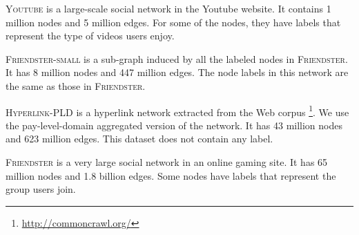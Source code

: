 \documentclass[sigconf]{acmart}
\newcommand{\dataset}[1]{\textsc{#1}\xspace}
\begin{document}
\begin{itemize}[leftmargin=10pt]
    \begin{item}
        \dataset{Youtube} \cite{mislove2007measurement} is a large-scale social network in the Youtube website. It contains 1 million nodes and 5 million edges. For some of the nodes, they have labels that represent the type of videos users enjoy.
    \end{item}
    \begin{item}
        \dataset{Friendster-small} \cite{yang2015defining} is a sub-graph induced by all the labeled nodes in \dataset{Friendster}. It has 8 million nodes and 447 million edges. The node labels in this network are the same as those in \dataset{Friendster}.
    \end{item}
    \begin{item}
        \dataset{Hyperlink-PLD} \cite{meusel2015graph} is a hyperlink network extracted from the Web corpus \footnote{\url{http://commoncrawl.org/}}. We use the pay-level-domain aggregated version of the network. It has 43 million nodes and 623 million edges. This dataset does not contain any label.
    \end{item}
    \begin{item}
        \dataset{Friendster} \cite{yang2015defining} is a very large social network in an online gaming site. It has 65 million nodes and 1.8 billion edges. Some nodes have labels that represent the group users join.
    \end{item}
\end{itemize}
\end{document}
